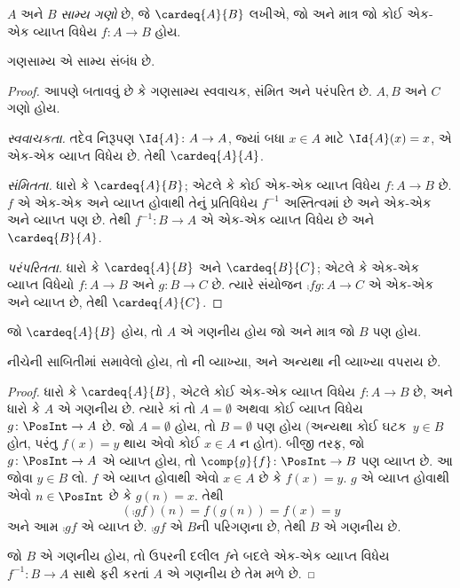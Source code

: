 \begin{defn}
  $A$ અને $B$ \emph{સામ્ય ગણો} છે, જે $\cardeq{A}{B}$ લખીએ,
  જો અને માત્ર જો કોઈ એક-એક વ્યાપ્ત વિધેય $f \colon A \to B$ હોય.
\end{defn}

\begin{prop}
ગણસામ્ય એ સામ્ય સંબંધ છે.
\end{prop}

\begin{proof}
આપણે બતાવવું છે કે ગણસામ્ય સ્વવાચક, સંમિત અને પરંપરિત છે.
$A, B$ અને $C$ ગણો હોય.

\emph{સ્વવાચકતા.} તદેવ નિરૂપણ $\Id{A} \colon A \to A$, જ્યાં
બધા $x \in A$ માટે $\Id{A} (x) = x$, એ એક-એક વ્યાપ્ત વિધેય છે.
તેથી $\cardeq{A}{A}$.

\emph{સંમિતતા.} ધારો કે $\cardeq{A}{B}$; એટલે કે કોઈ
એક-એક વ્યાપ્ત વિધેય $f\colon A \to B$ છે. $f$ એ એક-એક અને વ્યાપ્ત હોવાથી
તેનું પ્રતિવિધેય $f^{-1}$ અસ્તિત્વમાં છે અને એક-એક અને વ્યાપ્ત પણ છે.
તેથી $f^{-1}\colon B \to A$ એ એક-એક વ્યાપ્ત વિધેય છે અને
$\cardeq{B}{A}$.

\emph{પરંપરિતતા.} ધારો કે $\cardeq{A}{B}$ અને $\cardeq{B}{C}$;
એટલે કે એક-એક વ્યાપ્ત વિધેયો $f\colon A \to B$ અને $g\colon B \to
C$ છે. ત્યારે સંયોજન $\comp{f}{g}\colon A \to C$ એ એક-એક અને વ્યાપ્ત
છે, તેથી $\cardeq{A}{C}$.
\end{proof}

\begin{prop}
જો $\cardeq{A}{B}$ હોય, તો $A$ એ ગણનીય હોય જો અને
માત્ર જો $B$ પણ હોય.
\end{prop}

\begin{editorial}
નીચેની સાબિતીમાં  સમાવેલો હોય, તો
ની વ્યાખ્યા, અને અન્યથા
ની વ્યાખ્યા વપરાય છે.
\end{editorial}

\begin{proof}
ધારો કે $\cardeq{A}{B}$, એટલે કોઈ એક-એક વ્યાપ્ત વિધેય
$f \colon A \to B$ છે, અને ધારો કે $A$ એ ગણનીય છે.
  ત્યારે કાં તો $A = \emptyset$ અથવા કોઈ વ્યાપ્ત વિધેય
  $g\colon \PosInt \to A$ છે. જો $A = \emptyset$ હોય, તો
  $B = \emptyset$ પણ હોય (અન્યથા કોઈ ઘટક~$y \in B$ હોત,
  પરંતુ $f(x) = y$ થાય એવો કોઈ $x \in A$ ન હોત). બીજી તરફ,
  જો $g\colon \PosInt \to A$ એ વ્યાપ્ત હોય, તો
  $\comp{g}{f} \colon \PosInt \to B$ પણ વ્યાપ્ત છે.
  આ જોવા $y \in B$ લો. $f$ એ વ્યાપ્ત હોવાથી એવો
  $x \in A$ છે કે $f(x) = y$. $g$ એ વ્યાપ્ત હોવાથી
  એવો $n \in \PosInt$ છે કે $g(n) = x$. તેથી
\[
(\comp{g}{f})(n) = f(g(n)) = f(x) = y
\]
અને આમ $\comp{g}{f}$ એ વ્યાપ્ત છે. $\comp{g}{f}$ એ
$B$ની પરિગણના છે, તેથી $B$ એ ગણનીય છે.

જો $B$ એ ગણનીય હોય, તો ઉપરની દલીલ $f$ને બદલે
એક-એક વ્યાપ્ત વિધેય $f^{-1}\colon B \to A$ સાથે ફરી કરતાં $A$ એ
ગણનીય છે તેમ મળે છે.
\end{proof}

